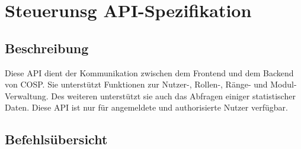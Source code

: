 \newpage
\section{Steuerunsg API-Spezifikation}\label{mapi}
\subsection{Beschreibung}Diese API dient der Kommunikation zwischen dem Frontend und dem Backend von {\glqq COSP\grqq}. Sie unterstützt Funktionen zur Nutzer-, Rollen-, Ränge- und Modul-Verwaltung. Des weiteren unterstützt sie auch das Abfragen einiger statistischer Daten. Diese API ist nur für angemeldete und authorisierte Nutzer verfügbar.
\subsection{Befehlsübersicht}
